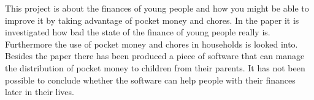 This project is about the finances of young people and how you might be able to improve it by taking advantage of pocket money and chores. In the paper it is investigated how bad the state of the finance of young people really is. Furthermore the use of pocket money and chores in households is looked into. Besides the paper there has been produced a piece of software that can manage the distribution of pocket money to children from their parents. It has not been possible to conclude whether the software can help people with their finances later in their lives. 
